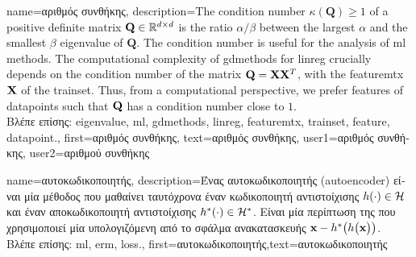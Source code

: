 {
	name={\foreignlanguage{greek}{αριθμός συνθήκης}},
	description={The condition number $\kappa(\mathbf{Q}) \geq 1$ of a 
		positive definite 
		matrix $\mathbf{Q} \in \mathbb{R}^{d \times d}$ is the ratio 
		$\alpha /\beta  $ between the 
		largest $\alpha$ and the smallest $\beta$ \gls{eigenvalue} of 
		$\mathbf{Q}$. The condition number is useful for the analysis of \gls{ml} methods. 
		The computational complexity of \gls{gdmethods} for \gls{linreg} crucially depends on the 
		condition number of the matrix $\mathbf{Q} = {\bf X} {\bf X}^{T}$, with the \gls{featuremtx} ${\bf X}$ 
		of the \gls{trainset}. Thus, from a computational perspective, we prefer \gls{feature}s of 
		\gls{datapoint}s such that $\mathbf{Q}$ has a condition number close to $1$.\\
		\foreignlanguage{greek}{Βλέπε επίσης:} \gls{eigenvalue}, \gls{ml}, \gls{gdmethods}, \gls{linreg}, \gls{featuremtx}, \gls{trainset}, \gls{feature}, \gls{datapoint}.},
		first={\foreignlanguage{greek}{αριθμός συνθήκης}},
		text={\foreignlanguage{greek}{αριθμός συνθήκης}},
		user1={\foreignlanguage{greek}{αριθμός συνθήκης}}, %
		user2={\foreignlanguage{greek}{αριθμού συνθήκης}} %
}


{name={\foreignlanguage{greek}{αυτοκωδικοποιητής}},
	description={\foreignlanguage{greek}{Ένας αυτοκωδικοποιητής} 
	(autoencoder) \foreignlanguage{greek}{είναι μία 
	μέθοδος}  \foreignlanguage{greek}{που μαθαίνει ταυτόχρονα έναν κωδικοποιητή αντιστοίχισης} 
	$h(\cdot) \in \mathcal{H}$ \foreignlanguage{greek}{και έναν αποκωδικοποιητή αντιστοίχισης} 
	$h^{*}(\cdot) \in \mathcal{H}^{*}$. \foreignlanguage{greek}{Είναι μία περίπτωση της} 
	 \foreignlanguage{greek}{που χρησιμοποιεί μία}  \foreignlanguage{greek}{υπολογιζόμενη από το σφάλμα ανακατασκευής}
	${\bf x} - h^{*}\big(  h \big( {\bf x} \big) \big)$.\\
	\foreignlanguage{greek}{Βλέπε επίσης:} \gls{ml}, \gls{erm}, \gls{loss}.},
	first={\foreignlanguage{greek}{αυτοκωδικοποιητής}},text={\foreignlanguage{greek}{αυτοκωδικοποιητής}}
}

